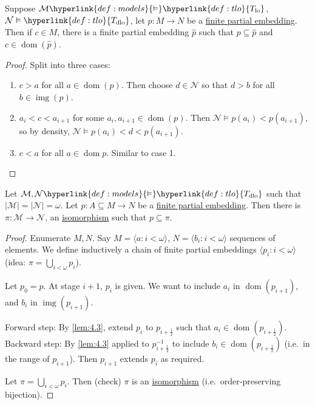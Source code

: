 \documentclass{article}
\let\models\vDash
\DeclareMathOperator{\dom}{dom}
\DeclareMathOperator{\img}{img}
\begin{document}
\begin{nlemma}\label{lem:4.3}
  Suppose $\mathcal{M} \hyperlink{def:models}{\models} \hyperlink{def:tlo}{T_{\text{lo}}}$, $\mathcal{N} \models \hyperlink{def:tlo}{T_{\text{dlo}}}$, let $p: M \to N$ be a \hyperlink{def:pe}{finite partial embedding}.
  Then if $c \in M$, there is a finite partial embedding $\hat{p}$ such that $p \subseteq \hat{p}$ and $c \in \dom(\hat{p})$.
\end{nlemma}
\begin{proof}
  Split into three cases:
  \begin{enumerate}[label=\arabic*.]
    \item $c > a$ for all $a \in \dom(p)$. Then choose $d \in \mathcal{N}$ so that $d > b$ for all $b \in \img(p)$.
    \item $a_i < c < a_{i+1}$ for some $a_i, a_{i+1} \in \dom(p)$.
      Then $\mathcal{N} \models p(a_i) < p(a_{i+1})$, so by density, $\mathcal{N} \models p(a_i) < d < p(a_{i+1})$.
     \item $c<a$ for all $a \in \dom p$. Similar to case 1. \qedhere
  \end{enumerate}
\end{proof}
\begin{nthm}\label{thm:4.4}
  Let $\mathcal{M}, \mathcal{N} \hyperlink{def:models}{\models} \hyperlink{def:tlo}{T_{\text{dlo}}}$ such that $|\mathcal{M}| = |\mathcal{N}| = \omega$.
  Let $p: A \subseteq M \to N$ be a \hyperlink{def:pe}{finite partial embedding}.
  Then there is $\pi: \mathcal{M} \to \mathcal{N}$, an \hyperlink{def:iso}{isomorphism} such that $p \subseteq \pi$.
\end{nthm}
\begin{proof}
  Enumerate $M, N$. Say $M = \langle a : i < \omega \rangle$, $N = \langle b_i : i < \omega \rangle$ sequences of elements.
  We define inductively a chain of finite partial embeddings $\langle p_i : i < \omega \rangle$ (idea: $\pi = \bigcup_{i < \omega} p_i$).

  Let $p_0 = p$.
  At stage $i+1$, $p_i$ is given. We want to include $a_i$ in $\dom(p_{i+1})$, and $b_i$ in $\operatorname{img}(p_{i+1})$.

  Forward step: By \cref{lem:4.3}, extend $p_i$ to $p_{i+\frac{1}{2}}$ such that $a_i \in \dom(p_{i + \frac{1}{2}})$.
  Backward step: By \cref{lem:4.3} applied to $p_{i+\frac{1}{2}}^{-1}$ to include $b_i \in \dom(p_{i+\frac{1}{2}})$ (i.e.\ in the range of $p_{i+1}$).
Then $p_{i+1}$ extends $p_i$ as required.

  Let $\pi = \bigcup_{i < \omega} p_i$. Then (check) $\pi$ is an \hyperlink{def:iso}{isomorphism} (i.e.\ order-preserving bijection).
\end{proof}
\end{document}
